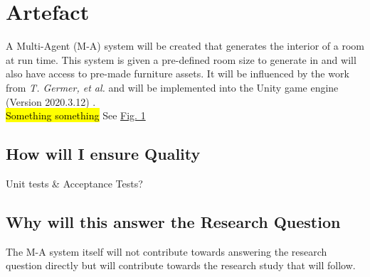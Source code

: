 \section{Artefact}

A Multi-Agent (M-A) system will be created that generates the interior of a room at run time. This system is given a pre-defined room size to generate in and will also have access to pre-made furniture assets. It will be influenced by the work from \textit{T. Germer, et al.} \cite{real-time-walkthroughs} and will be implemented into the Unity game engine (Version 2020.3.12) \cite{unity}.
\\
\hl{Something something} See \hyperref[activity-diagram]{Fig. 1}





\subsection{How will I ensure Quality}
Unit tests \& Acceptance Tests?

\subsection{Why will this answer the Research Question}
The M-A system itself will not contribute towards answering the research question directly but will contribute towards the research study that will follow. 

